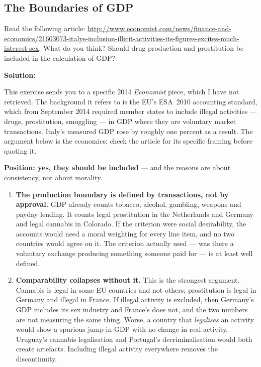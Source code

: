 \documentclass[12pt, letterpaper]{article}
\begin{document}
\subsection{The Boundaries of GDP}

\begin{tcolorbox}[evenbox,title={Problem 1.4 \quad Drugs and Prostitution}]
\begin{tcolorbox}[questionbox]
Read the following article:
\url{http://www.economist.com/news/finance-and-economics/21603073-italys-inclusion-illicit-activities-its-figures-excites-much-interest-sex}.
What do you think? Should drug production and prostitution be included in the calculation of
GDP?
\end{tcolorbox}

\textbf{Solution:}

\begin{tcolorbox}[databox,title={Note on sourcing}]
This exercise sends you to a specific 2014 \emph{Economist} piece, which I have not
retrieved. The background it refers to is the EU's ESA~2010 accounting standard, which from
September 2014 required member states to include illegal activities --- drugs, prostitution,
smuggling --- in GDP where they are voluntary market transactions. Italy's measured GDP rose
by roughly one percent as a result. The argument below is the economics; check the
article for its specific framing before quoting it.
\end{tcolorbox}

\textbf{Position: yes, they should be included} --- and the reasons are about consistency,
not about morality.

\begin{enumerate}

\item \textbf{The production boundary is defined by transactions, not by approval.} GDP
already counts tobacco, alcohol, gambling, weapons and payday lending. It counts legal
prostitution in the Netherlands and Germany and legal cannabis in Colorado. If the criterion
were social desirability, the accounts would need a moral weighting for every line item, and
no two countries would agree on it. The criterion actually used --- was there a voluntary
exchange producing something someone paid for --- is at least well defined.

\item \textbf{Comparability collapses without it.} This is the strongest argument. Cannabis
is legal in some EU countries and not others; prostitution is legal in Germany and illegal
in France. If illegal activity is excluded, then Germany's GDP includes its sex industry and
France's does not, and the two numbers are not measuring the same thing. Worse, a country
that \emph{legalises} an activity would show a spurious jump in GDP with no change in real
activity. Uruguay's cannabis legalisation and Portugal's decriminalisation would both create
artefacts. Including illegal activity everywhere removes the discontinuity.


\end{enumerate}
\end{tcolorbox}
\end{document}
